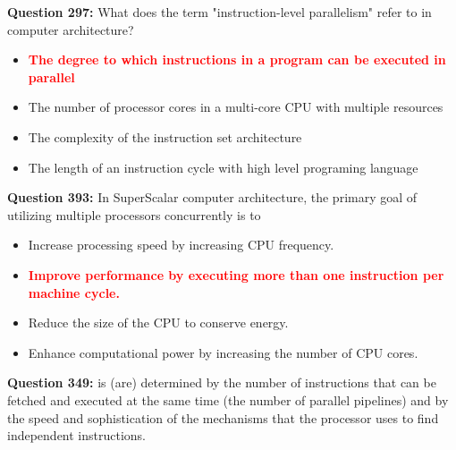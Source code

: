 \documentclass[12pt,a4paper]{article}
\begin{document}
\vspace{0.5cm}

\textbf{Question 297:} What does the term "instruction-level parallelism" refer to in computer architecture?

\begin{itemize}
    \item[\textbf{A.}] \textcolor{red}{\textbf{The degree to which instructions in a program can be executed in parallel}}
    \item[\textbf{B.}] The number of processor cores in a multi-core CPU with multiple resources
    \item[\textbf{C.}] The complexity of the instruction set architecture
    \item[\textbf{D.}] The length of an instruction cycle with high level programing language
\end{itemize}

\vspace{0.5cm}

\vspace{0.5cm}

\textbf{Question 393:} In SuperScalar computer architecture, the primary goal of utilizing multiple processors concurrently is to

\begin{itemize}
    \item[\textbf{A.}] Increase processing speed by increasing CPU frequency.
    \item[\textbf{B.}] \textcolor{red}{\textbf{Improve performance by executing more than one instruction per machine cycle.}}
    \item[\textbf{C.}] Reduce the size of the CPU to conserve energy.
    \item[\textbf{D.}] Enhance computational power by increasing the number of CPU cores.
\end{itemize}

\vspace{0.5cm}

\vspace{0.5cm}

\vspace{0.5cm}

\vspace{0.5cm}

\textbf{Question 349:} \underline{\hspace{1.5cm}} is (are) determined by the number of instructions that can be fetched and executed at the same time (the number of parallel pipelines) and by the speed and sophistication of the mechanisms that the processor uses to find independent instructions.
\end{document}
